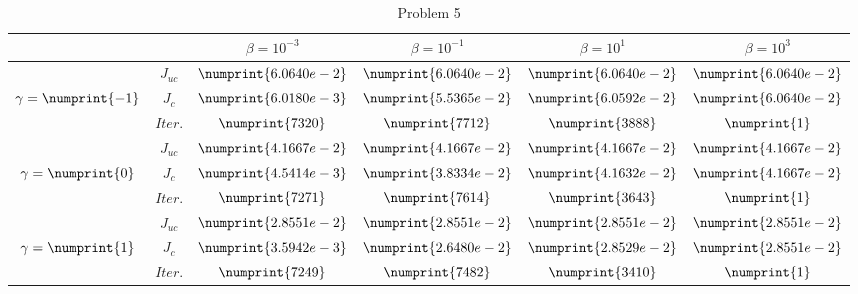 \begin{table}
\begin{tabular}{ ||c|| c | c | c | c | c ||}
\hline
& & $\beta = 10^{-3}$ & $\beta = 10^{-1}$ & $\beta = 10^{1}$ & $\beta = 10^{3}$  \\
\hline
 & $J_{uc}$ & $\numprint{6.0640e-2}$ & $\numprint{6.0640e-2}$ & $\numprint{6.0640e-2}$ & $\numprint{6.0640e-2}$ \\
$\gamma= \numprint{-1}$  & $J_c$ & $\numprint{6.0180e-3}$ & $\numprint{5.5365e-2}$ & $\numprint{6.0592e-2}$ & $\numprint{6.0640e-2}$ \\
& $Iter.$ & $\numprint{7320}$ & $\numprint{7712}$ & $\numprint{3888}$ & $\numprint{1}$ \\
\hline
 & $J_{uc}$ & $\numprint{4.1667e-2}$ & $\numprint{4.1667e-2}$ & $\numprint{4.1667e-2}$ & $\numprint{4.1667e-2}$ \\
$\gamma= \numprint{0}$  & $J_c$ & $\numprint{4.5414e-3}$ & $\numprint{3.8334e-2}$ & $\numprint{4.1632e-2}$ & $\numprint{4.1667e-2}$ \\
& $Iter.$ & $\numprint{7271}$ & $\numprint{7614}$ & $\numprint{3643}$ & $\numprint{1}$ \\
\hline
 & $J_{uc}$ & $\numprint{2.8551e-2}$ & $\numprint{2.8551e-2}$ & $\numprint{2.8551e-2}$ & $\numprint{2.8551e-2}$ \\
$\gamma= \numprint{1}$  & $J_c$ & $\numprint{3.5942e-3}$ & $\numprint{2.6480e-2}$ & $\numprint{2.8529e-2}$ & $\numprint{2.8551e-2}$ \\
& $Iter.$ & $\numprint{7249}$ & $\numprint{7482}$ & $\numprint{3410}$ & $\numprint{1}$ \\
\hline
\end{tabular}
\caption{Problem 5}
\label{TabS5:Prob5}
\end{table}
